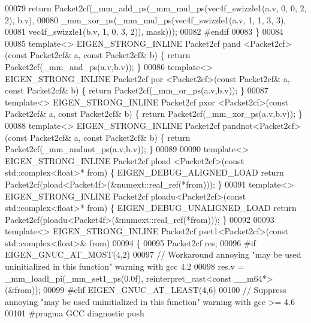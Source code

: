 \begin{DoxyCode}
00079   \textcolor{keywordflow}{return} Packet2cf(\_mm\_add\_ps(\_mm\_mul\_ps(vec4f\_swizzle1(a.v, 0, 0, 2, 2), b.v),
00080                               \_mm\_xor\_ps(\_mm\_mul\_ps(vec4f\_swizzle1(a.v, 1, 1, 3, 3),
00081                                                     vec4f\_swizzle1(b.v, 1, 0, 3, 2)), mask)));
00082 \textcolor{preprocessor}{  #endif}
00083 \}
00084 
00085 \textcolor{keyword}{template}<> EIGEN\_STRONG\_INLINE Packet2cf pand   <Packet2cf>(\textcolor{keyword}{const} Packet2cf& a, \textcolor{keyword}{const} Packet2cf& b) \{ \textcolor{keywordflow}{
      return} Packet2cf(\_mm\_and\_ps(a.v,b.v)); \}
00086 \textcolor{keyword}{template}<> EIGEN\_STRONG\_INLINE Packet2cf por    <Packet2cf>(\textcolor{keyword}{const} Packet2cf& a, \textcolor{keyword}{const} Packet2cf& b) \{ \textcolor{keywordflow}{
      return} Packet2cf(\_mm\_or\_ps(a.v,b.v)); \}
00087 \textcolor{keyword}{template}<> EIGEN\_STRONG\_INLINE Packet2cf pxor   <Packet2cf>(\textcolor{keyword}{const} Packet2cf& a, \textcolor{keyword}{const} Packet2cf& b) \{ \textcolor{keywordflow}{
      return} Packet2cf(\_mm\_xor\_ps(a.v,b.v)); \}
00088 \textcolor{keyword}{template}<> EIGEN\_STRONG\_INLINE Packet2cf pandnot<Packet2cf>(\textcolor{keyword}{const} Packet2cf& a, \textcolor{keyword}{const} Packet2cf& b) \{ \textcolor{keywordflow}{
      return} Packet2cf(\_mm\_andnot\_ps(a.v,b.v)); \}
00089 
00090 \textcolor{keyword}{template}<> EIGEN\_STRONG\_INLINE Packet2cf pload <Packet2cf>(\textcolor{keyword}{const} std::complex<float>* from) \{ 
      EIGEN\_DEBUG\_ALIGNED\_LOAD \textcolor{keywordflow}{return} Packet2cf(pload<Packet4f>(&numext::real\_ref(*from))); \}
00091 \textcolor{keyword}{template}<> EIGEN\_STRONG\_INLINE Packet2cf ploadu<Packet2cf>(\textcolor{keyword}{const} std::complex<float>* from) \{ 
      EIGEN\_DEBUG\_UNALIGNED\_LOAD \textcolor{keywordflow}{return} Packet2cf(ploadu<Packet4f>(&numext::real\_ref(*from))); \}
00092 
00093 \textcolor{keyword}{template}<> EIGEN\_STRONG\_INLINE Packet2cf pset1<Packet2cf>(\textcolor{keyword}{const} std::complex<float>&  from)
00094 \{
00095   Packet2cf res;
00096 \textcolor{preprocessor}{#if EIGEN\_GNUC\_AT\_MOST(4,2)}
00097   \textcolor{comment}{// Workaround annoying "may be used uninitialized in this function" warning with gcc 4.2}
00098   res.v = \_mm\_loadl\_pi(\_mm\_set1\_ps(0.0f), reinterpret\_cast<const \_\_m64*>(&from));
00099 \textcolor{preprocessor}{#elif EIGEN\_GNUC\_AT\_LEAST(4,6)}
00100   \textcolor{comment}{// Suppress annoying "may be used uninitialized in this function" warning with gcc >= 4.6}
00101 \textcolor{preprocessor}{  #pragma GCC diagnostic push}

\end{DoxyCode}
